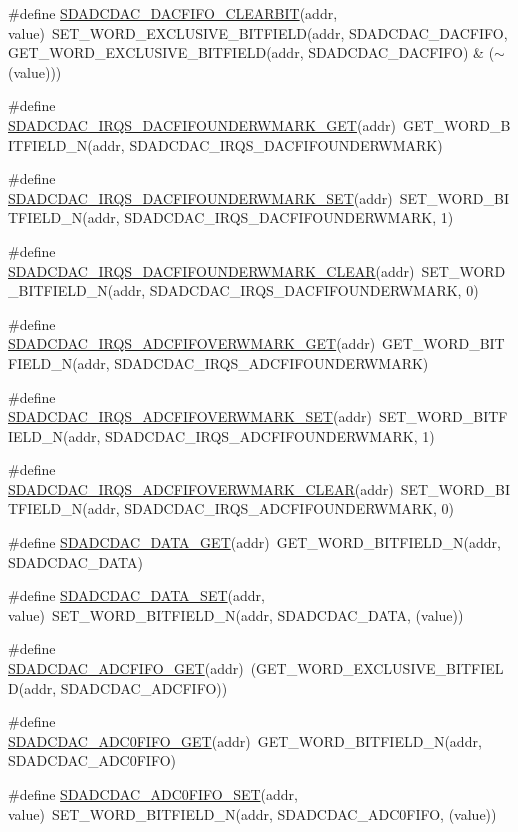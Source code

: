 \begin{DoxyCompactItemize}
\item 
\#define \hyperlink{a00568_a5dc1b5a5940f76baebdfa26465fb6738}{SDADCDAC\_\-DACFIFO\_\-CLEARBIT}(addr, value)~SET\_\-WORD\_\-EXCLUSIVE\_\-BITFIELD(addr, SDADCDAC\_\-DACFIFO, GET\_\-WORD\_\-EXCLUSIVE\_\-BITFIELD(addr, SDADCDAC\_\-DACFIFO) \& ($\sim$(value)))
\item 
\#define \hyperlink{a00568_ab7ebf433337d61c9d85f3bda8695dd78}{SDADCDAC\_\-IRQS\_\-DACFIFOUNDERWMARK\_\-GET}(addr)~GET\_\-WORD\_\-BITFIELD\_\-N(addr, SDADCDAC\_\-IRQS\_\-DACFIFOUNDERWMARK)
\item 
\#define \hyperlink{a00568_a30410bda7ed9ca668de515d23b64cc8e}{SDADCDAC\_\-IRQS\_\-DACFIFOUNDERWMARK\_\-SET}(addr)~SET\_\-WORD\_\-BITFIELD\_\-N(addr, SDADCDAC\_\-IRQS\_\-DACFIFOUNDERWMARK, 1)
\item 
\#define \hyperlink{a00568_ab9c61b6f3c1897d04c24e3c640d137c4}{SDADCDAC\_\-IRQS\_\-DACFIFOUNDERWMARK\_\-CLEAR}(addr)~SET\_\-WORD\_\-BITFIELD\_\-N(addr, SDADCDAC\_\-IRQS\_\-DACFIFOUNDERWMARK, 0)
\item 
\#define \hyperlink{a00568_aded7c21ad48cd9e04d7455ba918d6a67}{SDADCDAC\_\-IRQS\_\-ADCFIFOVERWMARK\_\-GET}(addr)~GET\_\-WORD\_\-BITFIELD\_\-N(addr, SDADCDAC\_\-IRQS\_\-ADCFIFOUNDERWMARK)
\item 
\#define \hyperlink{a00568_a3cb490811ad786d0ccbb90e3befd764b}{SDADCDAC\_\-IRQS\_\-ADCFIFOVERWMARK\_\-SET}(addr)~SET\_\-WORD\_\-BITFIELD\_\-N(addr, SDADCDAC\_\-IRQS\_\-ADCFIFOUNDERWMARK, 1)
\item 
\#define \hyperlink{a00568_a52b06b6e0f2c0d251acef0bf94211db4}{SDADCDAC\_\-IRQS\_\-ADCFIFOVERWMARK\_\-CLEAR}(addr)~SET\_\-WORD\_\-BITFIELD\_\-N(addr, SDADCDAC\_\-IRQS\_\-ADCFIFOUNDERWMARK, 0)
\item 
\#define \hyperlink{a00568_ae45dc219193dafd93782f286f26cd63c}{SDADCDAC\_\-DATA\_\-GET}(addr)~GET\_\-WORD\_\-BITFIELD\_\-N(addr, SDADCDAC\_\-DATA)
\item 
\#define \hyperlink{a00568_ab97b2855d8b6e6c782fe22d9348d49c3}{SDADCDAC\_\-DATA\_\-SET}(addr, value)~SET\_\-WORD\_\-BITFIELD\_\-N(addr, SDADCDAC\_\-DATA, (value))
\item 
\#define \hyperlink{a00568_a9a00f48ea4db150061560470cd5d0589}{SDADCDAC\_\-ADCFIFO\_\-GET}(addr)~(GET\_\-WORD\_\-EXCLUSIVE\_\-BITFIELD(addr, SDADCDAC\_\-ADCFIFO))
\item 
\#define \hyperlink{a00568_a08f92452ac87dba9f6fb59d228d512bd}{SDADCDAC\_\-ADC0FIFO\_\-GET}(addr)~GET\_\-WORD\_\-BITFIELD\_\-N(addr, SDADCDAC\_\-ADC0FIFO)
\item 
\#define \hyperlink{a00568_a29753ccf493c6b0cc28f1d86b49d4401}{SDADCDAC\_\-ADC0FIFO\_\-SET}(addr, value)~SET\_\-WORD\_\-BITFIELD\_\-N(addr, SDADCDAC\_\-ADC0FIFO, (value))

\end{DoxyCompactItemize}
